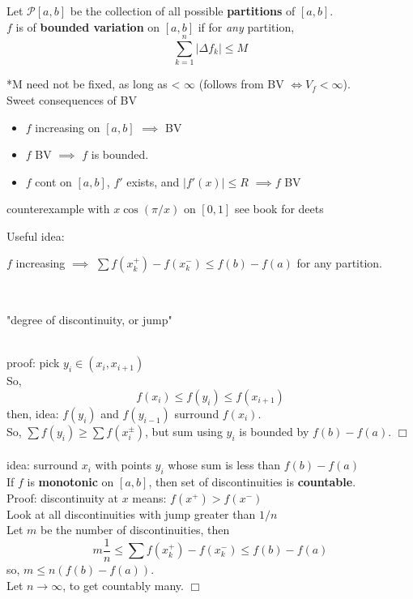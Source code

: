 \documentclass[12pt]{article}
\newcommand{\bt}[1]{\textbf{#1}} %
\newcommand{\cb}[1]{\centerline{\fbox{#1}}} %
\newcommand{\notimplies}{%
  \mathrel{{\ooalign{\hidewidth$\not\phantom{=}$\hidewidth\cr$\implies$}}}}
\newcommand{\gray}[1]{\textcolor[gray]{0.5}{#1}} %
\begin{document}
{Let $\mathcal{P}[a, b]$ be the collection of all possible \bt{partitions} of $[a, b]$.\\

$f$ is of \bt{bounded variation} on $[a, b]$ if for \textit{any} partition, 
$$\sum_{k=1}^n |\Delta f_k| \leq M$$

*M need not be fixed, as long as < $\infty$ (follows from BV $\iff V_f < \infty$).\\

\noindent Sweet consequences of BV

\begin{itemize}
    \item $f$ increasing on $[a, b]$ $\implies$ BV
    \item $f$ BV $\implies$ $f$ is bounded.
    \item $f$ cont on $[a, b]$, $f'$ exists, and $|f'(x)| \leq R$ $\implies f$ BV
\end{itemize}


\cb{\bt{continuous} $\notimplies$ BV}
\gray{counterexample with $x \cos(\pi / x)$ on $[0, 1]$ see book for deets}

Useful idea:\\
\centerline{$f$ increasing $\implies$ $\sum f(x_k^+) - f(x_{k}^-) \leq f(b) - f(a)$ for any partition.}\\
\centerline{"degree of discontinuity, or jump"}\\
\gray{proof: pick $y_i \in (x_i, x_{i+1})$\\
So, 
$$f(x_i) \leq f(y_i) \leq f(x_{i+1})$$
then, idea: $f(y_i)$ and $f(y_{i-1})$ surround $f(x_i)$.\\
So, $\sum f(y_i) \geq \sum f(x_i^\pm)$, but
sum using $y_i$ is bounded by $f(b) - f(a)$. $\Box$\\
\ \\
idea: surround $x_i$ with points $y_i$ whose sum is less than $f(b) - f(a)$}
\ \\

\noindent If $f$ is \bt{monotonic} on $[a, b]$, then set of discontinuities is \bt{countable}.\\
\textcolor[gray]{0.5}{Proof: 
discontinuity at $x$ means: $f(x^+) > f(x^-)$\\
Look at all discontinuities with jump greater than $1/n$\\
Let $m$ be the number of discontinuities, then \\
$$m \frac{1}{n} \leq \sum f(x_k^+) - f(x_k^-) \leq f(b) - f(a)$$
so, $m \leq n (f(b) - f(a))$. \\
Let $n \rightarrow \infty$, to get countably many. $\Box$}\\

}
\end{document}
